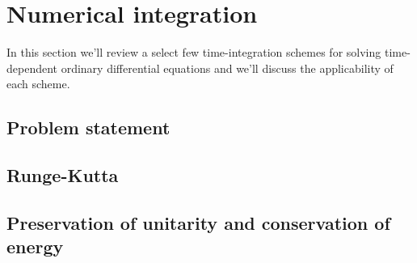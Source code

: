    \section{Numerical integration}
        In this section we'll review a select few time-integration schemes for
        solving time-dependent ordinary differential equations and we'll discuss the
        applicability of each scheme.

        \subsection{Problem statement}
        \subsection{Runge-Kutta}
        \subsection{Preservation of unitarity and conservation of energy}
